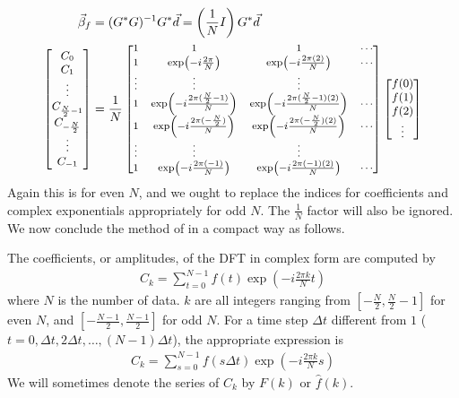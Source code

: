 \begin{align}
\vec{\beta}_f &= (G^*G)^{-1}G^*\vec{d} = \left(\frac{1}{N}I\right)G^*\vec{d} \nonumber \\
\small
\begin{bmatrix}
C_0 \\
C_1 \\
\vdots \\
C_{\frac{N}{2}-1} \\
C_{-\frac{N}{2}} \\
\vdots \\
C_{-1}
\end{bmatrix}
&= 
\frac{1}{N}
\footnotesize
\begin{bmatrix}
1 & 1 & 1 & \cdots \\
1 & \exp(-i\frac{2\pi}{N}) & \exp(-i\frac{2\pi(2)}{N}) & \cdots \\
\vdots & \vdots & \vdots & \\
1 & \exp(-i\frac{2\pi(\frac{N}{2}-1)}{N}) & \exp(-i\frac{2\pi(\frac{N}{2}-1)(2)}{N}) & \cdots \\
1 & \exp(-i\frac{2\pi(-\frac{N}{2})}{N}) & \exp(-i\frac{2\pi(-\frac{N}{2})(2)}{N}) & \cdots \\
\vdots & \vdots & \vdots & \\
1 & \exp(-i\frac{2\pi(-1)}{N}) & \exp(-i\frac{2\pi(-1)(2)}{N}) & \cdots
\end{bmatrix}
\small
\begin{bmatrix}
f(0) \\
f(1) \\
f(2) \\
\vdots
\end{bmatrix}
\end{align}
Again this is for even $N$, and we ought to replace the indices for coefficients and complex exponentials appropriately for odd $N$. The $\frac{1}{N}$ factor will also be ignored. We now conclude the method of  in a compact way as follows.
\begin{defn}
\label{defn:complexDFT}
The coefficients, or amplitudes, of the DFT in complex form are computed by
\begin{align}
C_k = \sum_{t=0}^{N-1} f(t)\exp(-i\frac{2\pi k}{N}t) \label{eqn:complexDFTCk}
\end{align}
where $N$ is the number of data. $k$ are all integers ranging from $[-\frac{N}{2}, \frac{N}{2}-1]$ for even $N$, and $[-\frac{N-1}{2}, \frac{N-1}{2}]$ for odd $N$. For a time step $\Delta t$ different from $1$ ($t = 0, \Delta t, 2\Delta t, \ldots, (N-1)\Delta t$), the appropriate expression is
\begin{align}
C_k = \sum_{s=0}^{N-1} f(s\Delta t)\exp(-i\frac{2\pi k}{N}s)
\end{align}
We will sometimes denote the series of $C_k$ by $F(k)$ or $\hat{f}(k)$.
\end{defn}
